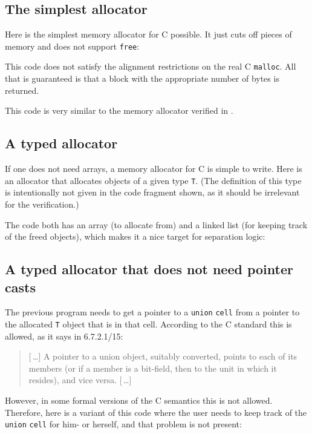\documentclass{article}
\begin{document}
\subsection{The simplest allocator}
Here is the simplest memory allocator for C possible.
It just cuts off pieces of memory and does not support \texttt{free}:

This code does not satisfy the alignment restrictions on the real
C \texttt{malloc}.
All that is guaranteed is that a block with the appropriate number of bytes is
returned.

This code is very similar to the memory allocator verified in \cite{ben:06,ben:06:1}.

\subsection{A typed allocator}
If one does not need arrays, a memory allocator for C is simple to write.
Here is an allocator that allocates objects of a given type \texttt{T}.
(The definition of this type is intentionally not given in the code
fragment shown, as it should be irrelevant for the verification.)

The code both has an array (to allocate from) and a linked list (for keeping
track of the freed objects), which makes it a nice target for separation logic:


\subsection{A typed allocator that does not need pointer casts}
The previous program needs to get a pointer to a \texttt{union} \texttt{cell}
from a pointer to the allocated \texttt{T} object that is in that cell.
According to the C standard \cite{iso:11} this is allowed, as it says in 6.7.2.1/15:
\begin{quote}
[\,\dots]
A pointer to a union object, suitably converted,
points to each of its members (or if a member is a
bit-field, then to the unit in which it resides), and
vice versa.
[\,\dots]
\end{quote}
However, in some formal versions of the C semantics \cite{kre:16} this is not allowed.
Therefore, here is a variant of this code where the user needs to keep
track of the \texttt{union} \texttt{cell} for him- or herself,
and that problem is not present:

\end{document}
